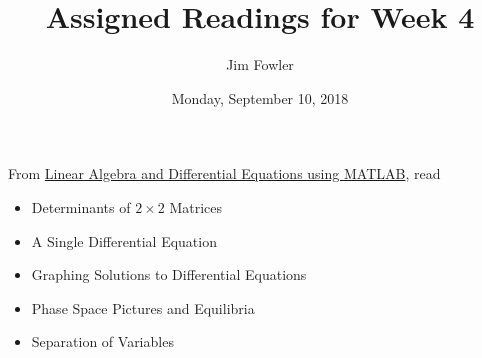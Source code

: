 \documentclass{homework}
\author{Jim Fowler}
\title{Assigned Readings for Week 4}
\date{Monday, September 10, 2018}
\begin{document}
\maketitle

From \href{/courses/43735/files/folder/textbooks}{Linear Algebra and Differential Equations using MATLAB}, read 
\begin{itemize}
\item {} Determinants of $2\times 2$ Matrices
\item {} A Single Differential Equation
\item {} Graphing Solutions to Differential Equations
\item {} Phase Space Pictures and Equilibria
\item {} Separation of Variables
\end{itemize}
\end{document}
